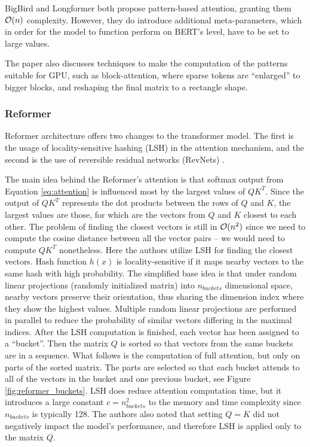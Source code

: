 BigBird and Longformer both propose pattern-based attention, granting them $\mathcal{O}(n)$ complexity.
However, they do introduce additional meta-parameters, which in order for the model to function perform on BERT's level, have to be set to large values. 

The paper also discusses techniques to make the computation of the patterns suitable for GPU, such as block-attention, where sparse tokens are ``enlarged'' to bigger blocks, and reshaping the final matrix to a rectangle shape.

\subsubsection{Reformer}

Reformer architecture \citep{reformer} offers two changes to the transformer model.
The first is the usage of locality-sensitive hashing (LSH) \citep{lsh} in the attention mechanism, and the second is the use of reversible residual networks (RevNets) \citep{revnets}.

The main idea behind the Reformer's attention is that softmax output from Equation \ref{eq:attention} is influenced most by the largest values of $QK^T$. 
Since the output of $QK^T$ represents the dot products between the rows of $Q$ and $K$, the largest values are those, for which are the vectors from $Q$ and $K$ closest to each other.
The problem of finding the closest vectors is still in $\mathcal{O}(n^2)$ since we need to compute the cosine distance between all the vector pairs -- we would need to compute $QK^T$ nonetheless. %
Here the authors utilize LSH for finding the closest vectors.
Hash function $h(x)$ is locality-sensitive if it maps nearby vectors to the same hash with high probability. 
The simplified base idea is that under random linear projections (randomly initialized matrix) into $n_{buckets}$ dimensional space, nearby vectors preserve their orientation, thus sharing the dimension index where they show the highest values.
Multiple random linear projections are performed in parallel to reduce the probability of similar vectors differing in the maximal indices.
After the LSH computation is finished, each vector has been assigned to a ``bucket''.
Then the matrix $Q$ is sorted so that vectors from the same buckets are in a sequence.
What follows is the computation of full attention, but only on parts of the sorted matrix.
The parts are selected so that each bucket attends to all of the vectors in the bucket and one previous bucket, see Figure \ref{fig:reformer_buckets}.
LSH does reduce attention computation time, but it introduces a large constant $c=n_{buckets}^2$ to the memory and time complexity since $n_{buckets}$ is typically 128.
The authors also noted that setting $Q=K$ did not negatively impact the model's performance, and therefore LSH is applied only to the matrix $Q$.

